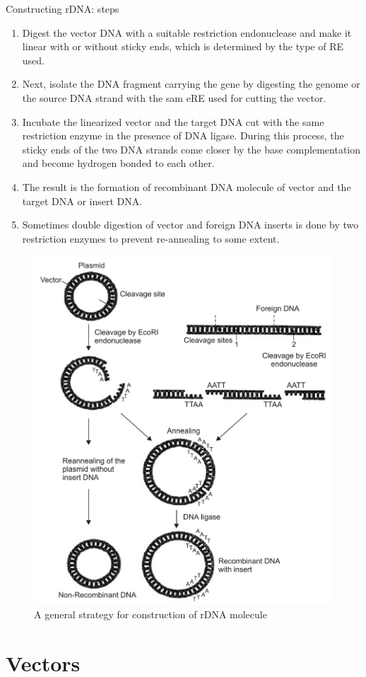 \documentclass[11pt,dvipsnames,ignorenonframetext,aspectratio=169]{beamer}
\providecommand{\tightlist}{%
  \setlength{\itemsep}{0pt}\setlength{\parskip}{0pt}}
\begin{document}
\begin{frame}{Constructing rDNA: steps}
\protect\hypertarget{constructing-rdna-steps}{}

\begin{enumerate}
\tightlist
\item
  Digest the vector DNA with a suitable restriction endonuclease and
  make it linear with or without sticky ends, which is determined by the
  type of RE used.
\item
  Next, isolate the DNA fragment carrying the gene by digesting the
  genome or the source DNA strand with the sam eRE used for cutting the
  vector.
\item
  Incubate the linearized vector and the target DNA cut with the same
  restriction enzyme in the presence of DNA ligase. During this process,
  the sticky ends of the two DNA strands come closer by the base
  complementation and become hydrogen bonded to each other.
\item
  The result is the formation of recombinant DNA molecule of vector and
  the target DNA or insert DNA.
\item
  Sometimes double digestion of vector and foreign DNA inserts is done
  by two restriction enzymes to prevent re-annealing to some extent.
\end{enumerate}

\end{frame}

\begin{frame}{}
\protect\hypertarget{section-20}{}

\begin{figure}
\includegraphics[width=0.35\linewidth]{./../images/construction_rdna_molecule} \caption{A general strategy for construction of rDNA molecule}\label{fig:rdna-construction}
\end{figure}

\end{frame}

\hypertarget{vectors}{%
\section{Vectors}\label{vectors}}
\end{document}
